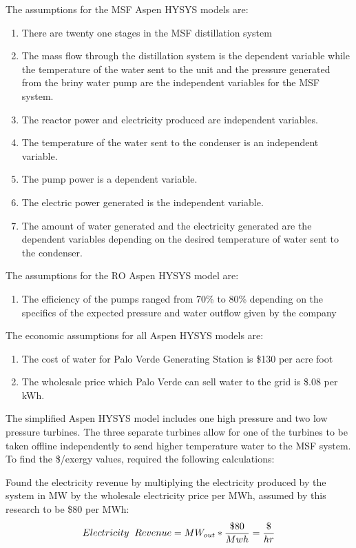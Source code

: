 The assumptions for the MSF Aspen HYSYS models are:

\begin{enumerate}
\item There are twenty one stages in the MSF distillation system \cite{Bodalal2010}
\item The mass flow through the distillation system is the dependent variable while the temperature of the water sent to the unit and the pressure generated from the briny water pump are the independent variables for the MSF system.
\item The reactor power and electricity produced are independent variables.
\item The temperature of the water sent to the condenser is an independent variable.
\item The pump power is a dependent variable.
\item The electric power generated is the independent variable.
\item The amount of water generated and the electricity generated are the dependent variables depending on the desired temperature of water sent to the condenser.
\end{enumerate}

The assumptions for the RO Aspen HYSYS model are:

\begin{enumerate}
\item The efficiency of the pumps ranged from 70\% to 80\% depending on the specifics of the expected pressure and water outflow given by the company
\end{enumerate}

The economic assumptions for all Aspen HYSYS models are:
\begin{enumerate}
\item The cost of water for Palo Verde Generating Station is \$130 per acre foot \cite{Brown2018}
\item The wholesale price which Palo Verde can sell water to the grid is \$.08 per kWh.
\end{enumerate}

The simplified Aspen HYSYS model includes one high pressure and two low pressure turbines.  The three separate turbines allow for one of the turbines to be taken offline independently to send higher temperature water to the MSF system. To find the \$/exergy values, required the following calculations:

Found the electricity revenue by multiplying the electricity produced by the system in MW by the wholesale electricity price per MWh, assumed by this research to be \$80 per MWh:
\begin{equation}
Electricity\hspace{.2cm} Revenue=MW_{out}*\frac{\$80}{Mwh}=\frac{\$}{hr}
\end{equation}

